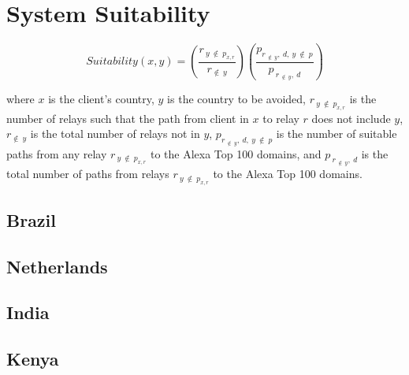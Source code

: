 \section{System Suitability}


\[Suitability(x,y) = (\frac{r_{~y~ \notin ~p_{x,r}}}{r_{\notin ~ y}})(\frac{p_{r_{~\notin ~y}, ~d, ~y ~\notin ~p}}{p_{~r_{~\notin ~y},~d}})\]

where $x$ is the client's country, $y$ is the country to be avoided, $r_{~y~ \notin ~p_{x,r}}$ is the number of relays such that the path from client in $x$ to relay $r$ does not include $y$, $r_{\notin ~ y}$ is the total number of relays not in $y$, $p_{r_{~\notin ~y}, ~d, ~y ~\notin ~p}$ is the number of suitable paths from any relay $r_{~y~ \notin ~p_{x,r}}$ to the Alexa Top 100 domains, and $p_{~r_{~\notin ~y},~d}$ is the total number of paths from relays $r_{~y~ \notin ~p_{x,r}}$ to the Alexa Top 100 domains.

\subsection{Brazil}

\subsection{Netherlands}

\subsection{India}

\subsection{Kenya}
